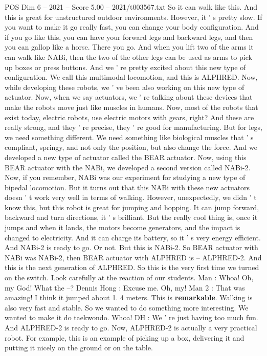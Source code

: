 \begin{textsample}{POS Dim 6 – 2021 – Score 5.00 – 2021/t003567.txt}
So it can walk like this.
And this is great for unstructured outdoor environments.
However, it ' s pretty slow.
If you want to make it go really fast, you can change your body configuration.
And if you go like this, you can have your forward legs and backward legs, and then you can gallop like a horse.
There you go.
And when you lift two of the arms it can walk like NABi, then the two of the other legs can be used as arms to pick up boxes or press buttons.
And we ' re pretty excited about this new type of configuration.
We call this multimodal locomotion, and this is ALPHRED.
Now, while developing these robots, we ' ve been also working on this new type of actuator.
Now, when we say actuators, we ' re talking about these devices that make the robots move just like muscles in humans.
Now, most of the robots that exist today, electric robots, use electric motors with gears, right?
And these are really strong, and they ' re precise, they ' re good for manufacturing.
But for legs, we need something different.
We need something like biological muscles that ' s compliant, springy, and not only the position, but also change the force.
And we developed a new type of actuator called the BEAR actuator.
Now, using this BEAR actuator with the NABi, we developed a second version called NABi-2.
Now, if you remember, NABi was our experiment for studying a new type of bipedal locomotion.
But it turns out that this NABi with these new actuators doesn ' t work very well in terms of walking.
However, unexpectedly, we didn ' t know this, but this robot is great for jumping and hopping.
It can jump forward, backward and turn directions, it ' s brilliant.
But the really cool thing is, once it jumps and when it lands, the motors become generators, and the impact is changed to electricity.
And it can charge its battery, so it ' s very energy efficient.
And NABi-2 is ready to go.
Or not.
But this is NABi-2.
So BEAR actuator with NABi was NABi-2, then BEAR actuator with ALPHRED is -- ALPHRED-2.
And this is the next generation of ALPHRED.
So this is the very first time we turned on the switch.
Look carefully at the reaction of our students.
Man : Whoa!
Oh, my God!
What the --?
Dennis Hong : Excuse me.
Oh, my!
Man 2 : That was amazing!
I think it jumped about 1. 4 meters.
This is \textbf{remarkable}.
Walking is also very fast and stable.
So we wanted to do something more interesting.
We wanted to make it do taekwondo.
Whoa!
DH : We ' re just having too much fun.
And ALPHRED-2 is ready to go.
Now, ALPHRED-2 is actually a very practical robot.
For example, this is an example of picking up a box, delivering it and putting it nicely on the ground or on the table.

\end{textsample}

